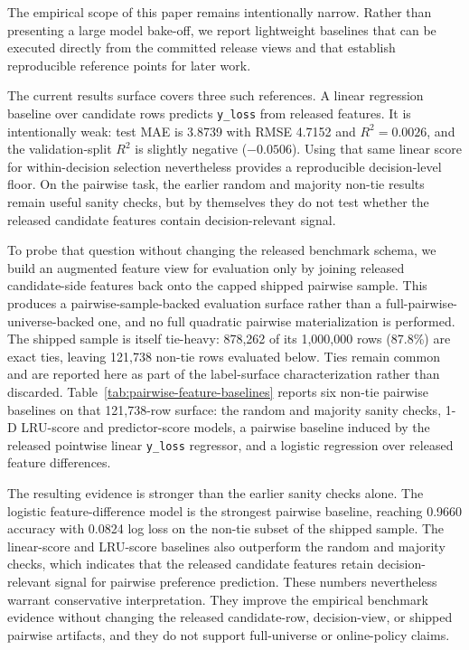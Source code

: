 The empirical scope of this paper remains intentionally narrow. Rather than presenting a large model bake-off, we report lightweight baselines that can be executed directly from the committed release views and that establish reproducible reference points for later work.

\begin{sloppypar}
The current results surface covers three such references. A linear regression baseline over candidate rows predicts \texttt{y\_loss} from released features. It is intentionally weak: test MAE is 3.8739 with RMSE 4.7152 and $R^2=0.0026$, and the validation-split $R^2$ is slightly negative ($-0.0506$). Using that same linear score for within-decision selection nevertheless provides a reproducible decision-level floor. On the pairwise task, the earlier random and majority non-tie results remain useful sanity checks, but by themselves they do not test whether the released candidate features contain decision-relevant signal.
\end{sloppypar}

To probe that question without changing the released benchmark schema, we build an augmented feature view for evaluation only by joining released candidate-side features back onto the capped shipped pairwise sample. This produces a pairwise-sample-backed evaluation surface rather than a full-pairwise-universe-backed one, and no full quadratic pairwise materialization is performed. The shipped sample is itself tie-heavy: 878,262 of its 1,000,000 rows (87.8\%) are exact ties, leaving 121,738 non-tie rows evaluated below. Ties remain common and are reported here as part of the label-surface characterization rather than discarded. Table~\ref{tab:pairwise-feature-baselines} reports six non-tie pairwise baselines on that 121,738-row surface: the random and majority sanity checks, 1-D LRU-score and predictor-score models, a pairwise baseline induced by the released pointwise linear \texttt{y\_loss} regressor, and a logistic regression over released feature differences.

The resulting evidence is stronger than the earlier sanity checks alone. The logistic feature-difference model is the strongest pairwise baseline, reaching 0.9660 accuracy with 0.0824 log loss on the non-tie subset of the shipped sample. The linear-score and LRU-score baselines also outperform the random and majority checks, which indicates that the released candidate features retain decision-relevant signal for pairwise preference prediction. These numbers nevertheless warrant conservative interpretation. They improve the empirical benchmark evidence without changing the released candidate-row, decision-view, or shipped pairwise artifacts, and they do not support full-universe or online-policy claims.

